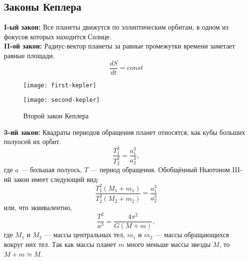 \subsection{Законы Кеплера}
{\bfseries I-ый закон:} Все планеты движутся по 
эллиптическим орбитам, в одном из фокусов которых 
находится Солнце.\\
{\bfseries II-ой закон:} Радиус-вектор планеты за 
равные промежутки времени заметает равные площади.
\begin{equation}
\frac{dS}{dt}=const
\end{equation}
\begin{figure}[h!]
\begin{minipage}[b]{0.5\textwidth}
\centering
\texttt{[image: first-kepler]}
\caption{Первый закон Кеплера}
\end{minipage}
\begin{minipage}[b]{0.5\textwidth}
\centering
\texttt{[image: second-kepler]}
\caption {Второй закон Кеплера}
\end{minipage}
\end{figure}

{\noindent \bfseries 3-ий закон:} Квадраты периодов обращения планет 
относятся, как кубы больших полуосей их орбит.
\begin{equation}
\frac{T^2_1}{T^2_2}=\frac{a^3_1}{a^3_2},
\end{equation}
где $a$ --- большая полуось, $T$ --- период обращения.
Обобщённый Ньютоном III-ий закон имеет следующий вид:
\begin{equation}
\frac{T^2_1(M_1+m_1)}{T^2_2(M_2+m_2)}=\frac{a^3_1}{a^3_2}
\end{equation}
или, что эквивалентно, \begin{equation}
	\frac{T^2}{a^3}=\frac{4\pi^2}{G(M+m)},
\end{equation}
где $M_1$ и $M_2$ --- массы центральных тел, $m_1$ и 
$m_2$ --- массы обращающихся вокруг них тел. Так как массы планет 
$m$ много меньше массы звезды $M$, то $M + m \simeq M$.